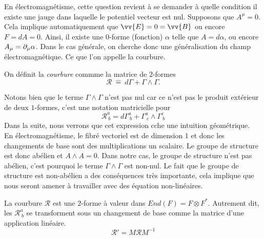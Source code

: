\documentclass[a4paper,11pt]{report}
\begin{document}
                \begin{exmp}
                    En électromagnétisme, cette question revient à se demander à quelle condition il existe une jauge dans laquelle le potentiel vecteur est nul. Supposons que $A^\mu = 0$. Cela implique automatiquement que $\vv{E} = 0 = \vv{B}$ ou encore $F = dA = 0$. Ainsi, il existe une $0$-forme (fonction) $\alpha$ telle que $A = d\alpha$, ou encore $A_\mu = \partial_\mu\alpha$. Dans le cas générale, on cherche donc une généralisation du champ électromagnétique. Ce que l'on appelle la courbure.
                \end{exmp}
                
                \begin{definition}
                    On définit la \textit{courbure} commme la matrice de $2$-formes
                    \begin{equation}
                        \mathscr{R}~\hat{=}~d\Gamma + \Gamma\wedge\Gamma.
                    \end{equation}
                \end{definition}
                Notons bien que le terme $\Gamma\wedge\Gamma$ n'est pas nul car ce n'est pas le produit extérieur de deux $1$-formes, c'est une notation matricielle pour
                \begin{equation}
                    \mathscr{R}^a_{~b} = d\Gamma^a_{~b} + \Gamma^a_{~c}\wedge\Gamma^c_{~b}
                \end{equation}
                Dans la suite, nous verrons que cet expression cche une intuition géométrique.\\
                
                En électromagnétisme, le fibré vectoriel est de dimension $1$ et donc les changements de base sont des multiplications un scalaire. Le groupe de structure est donc abélien et $A\wedge A = 0$. Dans notre cas, le groupe de structure n'est pas abélien, c'est pourquoi le terme $\Gamma\wedge\Gamma$ est non-nul. Le fait que le groupe de structure est non-abélien a des conséquences très importante, cela implique que nous seront amener à travailler avec des équation non-linéaires.
                
                \begin{thm}\begin{leftbar}
                    La courbure $\mathscr{R}$ est une $2$-forme à  valeur dans $End(F)= F\otimes F^*$. Autrement dit, les $\mathscr{R}^a_{~b}$ se transforment sous un changement de base comme la matrice d'une application linéaire.
                    \begin{equation}
                        \mathscr{R}' = M\mathscr{R}M^{-1}
                    \end{equation}
                \end{leftbar}\end{thm}
                
\end{document}
